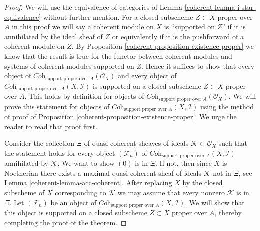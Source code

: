 \begin{proof}

We will use the equivalence of categories of
Lemma \ref{coherent-lemma-i-star-equivalence}
without further mention.
For a closed subscheme $Z \subset X$ proper over $A$
in this proof we will say a coherent module on $X$ is
``supported on $Z$'' if it is annihilated by the ideal
sheaf of $Z$ or equivalently if it is the pushforward
of a coherent module on $Z$.
By Proposition \ref{coherent-proposition-existence-proper} we know
that the result is true for
the functor between coherent modules and systems of coherent
modules supported on $Z$. Hence it suffices to show that
every object of
$\textit{Coh}_{\text{support proper over }A}(\mathcal{O}_X)$
and every object of
$\textit{Coh}_{\text{support proper over }A}(X, \mathcal{I})$ is
supported on a closed subscheme $Z \subset X$ proper over $A$.
This holds by definition for objects of
$\textit{Coh}_{\text{support proper over }A}(\mathcal{O}_X)$.
We will prove this statement for objects of
$\textit{Coh}_{\text{support proper over }A}(X, \mathcal{I})$
using the method of proof of Proposition \ref{coherent-proposition-existence-proper}.
We urge the reader to read that proof first.

\medskip\noindent
Consider the collection $\Xi$ of quasi-coherent sheaves of ideals
$\mathcal{K} \subset \mathcal{O}_X$ such that the statement holds
for every object $(\mathcal{F}_n)$ of
$\textit{Coh}_{\text{support proper over }A}(X, \mathcal{I})$
annihilated by $\mathcal{K}$. We want to show $(0)$ is in $\Xi$.
If not, then since $X$ is Noetherian there exists a maximal
quasi-coherent sheaf of ideals $\mathcal{K}$ not in $\Xi$, see
Lemma \ref{coherent-lemma-acc-coherent}.
After replacing $X$ by the closed subscheme of $X$
corresponding to $\mathcal{K}$ we may assume that every nonzero
$\mathcal{K}$ is in $\Xi$. Let $(\mathcal{F}_n)$ be an object of
$\textit{Coh}_{\text{support proper over }A}(X, \mathcal{I})$.
We will show that this object is supported on a closed subscheme
$Z \subset X$ proper over $A$, thereby completing the
proof of the theorem.


\end{proof}
